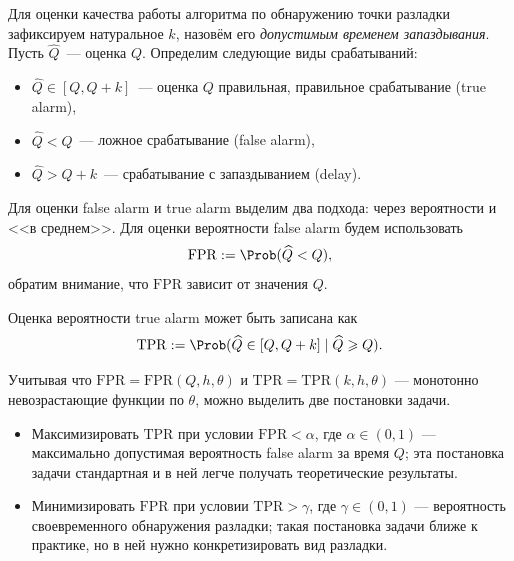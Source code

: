 \documentclass{math-mech-sci}
\newcommand{\FPR}{\mathrm{FPR}}
\newcommand{\TPR}{\mathrm{TPR}}
\newcommand{\FARL}{\mathrm{FARL}}
\newcommand{\TARL}{\mathrm{TARL}}
\renewcommand{\geq}{\geqslant}
\begin{document}
Для оценки качества работы алгоритма по обнаружению точки разладки зафиксируем натуральное $k$, назовём его \textit{допустимым временем запаздывания}. Пусть $\widehat Q$~--- оценка $Q$. Определим следующие виды срабатываний:
\begin{itemize}
	\item $\widehat Q\in [Q,Q+k]$~--- оценка $Q$ правильная, правильное срабатывание (true alarm),
	\item $\widehat Q<Q$~--- ложное срабатывание (false alarm),
	\item $\widehat Q>Q+k$~--- срабатывание с запаздыванием (delay).
\end{itemize}

Для оценки false alarm и true alarm выделим два подхода: через вероятности и <<в среднем>>. Для оценки вероятности false alarm будем использовать
	\begin{equation}
	\FPR:=\Prob(\widehat Q<Q),
	\end{equation}
	обратим внимание, что $\FPR$ зависит от значения $Q$. 

Оценка вероятности true alarm может быть записана как
	\begin{equation}
		\TPR:=\Prob(\widehat Q\in[Q,Q+k]\mid \widehat Q\geq Q).
	\end{equation}
	

Учитывая что $\FPR = \FPR(Q,h,\theta)$ и $\TPR= \TPR(k,h,\theta)$ --- монотонно невозрастающие функции по $\theta$, можно выделить две постановки задачи.
\begin{itemize}
	\item Максимизировать $\TPR$ при условии $\FPR<\alpha$, где $\alpha\in(0,1)$ --- максимально допустимая вероятность false alarm за время $Q$; эта постановка задачи стандартная и в ней легче получать теоретические результаты.
	\item Минимизировать $\FPR$ при условии $\TPR>\gamma$, где $\gamma\in(0,1)$ --- вероятность своевременного обнаружения разладки; такая постановка задачи ближе к практике, но в ней нужно конкретизировать вид разладки.
\end{itemize}
\end{document}
